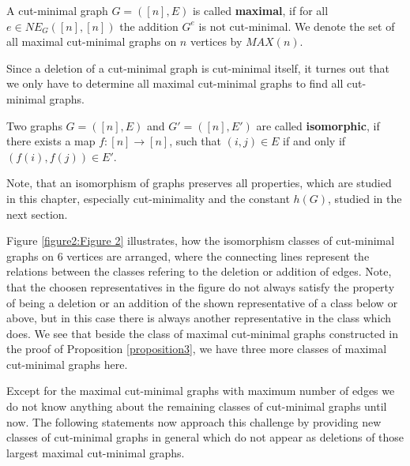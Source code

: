 \begin{defi}
A cut-minimal graph \(G=([n],E)\) is called \textbf{maximal}, if for all\\
\(e\in NE_G([n],[n])\) the addition \(G^e\) is not cut-minimal. We denote the set of all maximal cut-minimal graphs on \(n\) vertices by \(MAX(n)\).
\end{defi}
Since a deletion of a cut-minimal graph is cut-minimal itself, it turnes out that we only have to determine all maximal cut-minimal graphs to find all cut-minimal graphs.
\begin{defi}
Two graphs \(G=([n],E)\) and \(G'=([n],E')\) are called \textbf{isomorphic}, if there exists a map \(f:[n]\rightarrow [n]\), such that \((i,j)\in E\) if and only if \((f(i),f(j))\in E'\).
\end{defi}
\begin{rem}
Note, that an isomorphism of graphs preserves all properties, which are studied in this chapter, especially cut-minimality and the constant \(h(G)\), studied in the next section.
\end{rem}
Figure \ref{figure2:Figure 2} illustrates, how the isomorphism classes of cut-minimal graphs on \(6\) vertices are arranged, where the connecting lines represent the relations between the classes refering to the deletion or addition of edges. Note, that the choosen representatives in the figure do not always satisfy the property of being a deletion or an addition of the shown representative of a class below or above, but in this case there is always another representative in the class which does. We see that beside the class of maximal cut-minimal graphs constructed in the proof of Proposition \ref{proposition3}, we have three more classes of maximal cut-minimal graphs here.



Except for the maximal cut-minimal graphs with maximum number of edges we do not know anything about the remaining classes of cut-minimal graphs until now. The following statements now approach this challenge by providing new classes of cut-minimal graphs in general which do not appear as deletions of those largest maximal cut-minimal graphs.

\newpage

